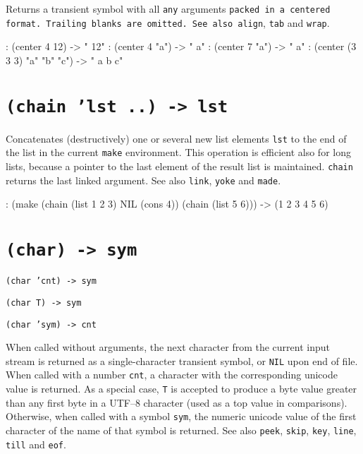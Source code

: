 Returns a transient symbol with all \texttt{any} arguments \texttt{packed in a centered format. Trailing blanks are omitted. See also align}, \texttt{tab}
and \texttt{wrap}.


\begin{wideverbatim}
: (center 4 12)
-> " 12"
: (center 4 "a")
-> " a"
: (center 7 "a")
-> "   a"
: (center (3 3 3) "a" "b" "c")
-> " a  b  c"
\end{wideverbatim}

 
\section*{\texttt{(chain 'lst ..) -> lst}}
\label{sec:funct-rec-C-(chain-'lst-..)-->-lst}


Concatenates (destructively) one or several new list elements \texttt{lst} to
the end of the list in the current \texttt{make} environment. This operation is
efficient also for long lists, because a pointer to the last element of
the result list is maintained. \texttt{chain} returns the last linked argument.
See also \texttt{link}, \texttt{yoke} and \texttt{made}.


\begin{wideverbatim}
: (make (chain (list 1 2 3) NIL (cons 4)) (chain (list 5 6)))
-> (1 2 3 4 5 6)
\end{wideverbatim}

 
\section*{\texttt{(char) -> sym}}
\label{sec:funct-rec-C-(char)-->-sym}


\texttt{(char 'cnt) -> sym}

\texttt{(char T) -> sym}

\texttt{(char 'sym) -> cnt}

When called without arguments, the next character from the current input
stream is returned as a single-character transient symbol, or \texttt{NIL} upon
end of file. When called with a number \texttt{cnt}, a character with the
corresponding unicode value is returned. As a special case, \texttt{T} is
accepted to produce a byte value greater than any first byte in a UTF--8
character (used as a top value in comparisons). Otherwise, when called
with a symbol \texttt{sym}, the numeric unicode value of the first character of
the name of that symbol is returned. See also \texttt{peek}, \texttt{skip}, \texttt{key},
\texttt{line}, \texttt{till} and \texttt{eof}.


